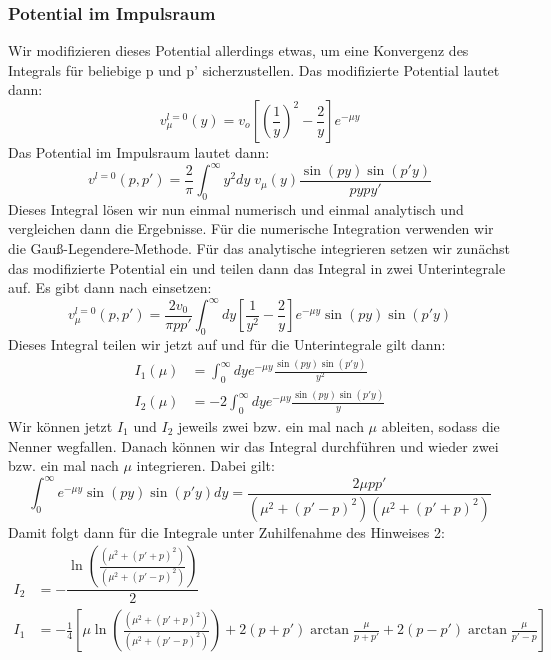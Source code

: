 \documentclass[11pt,a4paper]{article}
\begin{document}
\subsubsection*{Potential im Impulsraum}
Wir modifizieren dieses Potential allerdings etwas, um eine Konvergenz des Integrals für beliebige p und p' sicherzustellen. Das modifizierte Potential lautet dann:
\begin{equation}
	v_{\mu}^{l=0}(y) = v_o\left[\left(\frac{1}{y}\right)^2 -\frac{2}{y}\right]e^{-\mu y}
\end{equation}
Das Potential im Impulsraum lautet dann:
\begin{equation}
	v^{l=0}(p,p') = \frac{2}{\pi}\int_{0}^{\infty}y^2dy\; v_{\mu}(y)\frac{\sin(py)\sin(p'y)}{pypy'}
\end{equation}
Dieses Integral lösen wir nun einmal numerisch und einmal analytisch und vergleichen dann die Ergebnisse. Für die numerische Integration verwenden wir die Gauß-Legendere-Methode. Für das analytische integrieren setzen wir zunächst das modifizierte Potential ein und teilen dann das Integral in zwei Unterintegrale auf. Es gibt dann nach einsetzen:
\begin{equation}
	v_{\mu}^{l=0}(p,p') = \frac{2v_0}{\pi pp'}\int_{0}^{\infty}dy \left[\frac{1}{y^2}-\frac{2}{y}\right]e^{-\mu y}\sin(py)\sin(p'y)
\end{equation}
Dieses Integral teilen wir jetzt auf und für die Unterintegrale gilt dann:
\begin{align*}
	I_1(\mu) &= \int_{0}^{\infty}dye^{-\mu y}\frac{\sin(py)\sin(p'y)}{y^2} \\
	I_2(\mu) &= -2\int_{0}^{\infty}dye^{-\mu y}\frac{\sin(py)\sin(p'y)}{y}
\end{align*}
Wir können jetzt $I_1$ und $I_2$ jeweils zwei bzw. ein mal nach $\mu$ ableiten, sodass die Nenner wegfallen. Danach können wir das Integral durchführen und wieder zwei bzw. ein mal nach $\mu$ integrieren.
Dabei gilt:
\begin{equation*}
	\int_{0}^{\infty}e^{-\mu y}\sin(py)\sin(p'y)dy = \frac{2\mu pp'}{(\mu^2+(p'-p)^2)(\mu^2+(p'+p)^2)}
\end{equation*}
Damit folgt dann für die Integrale unter Zuhilfenahme des Hinweises 2:
\begin{align}
	I_2 &= -\dfrac{\ln(\frac{(\mu^2+(p'+p)^2)}{(\mu^2+(p'-p)^2)})}{2} \\
	I_1 &= -\frac{1}{4}\left[\mu\ln(\frac{(\mu^2+(p'+p)^2)}{(\mu^2+(p'-p)^2)}) +2(p+p')\arctan\frac{\mu}{p+p'} +2(p-p')\arctan\frac{\mu}{p'-p}\right]
\end{align}
\end{document}
